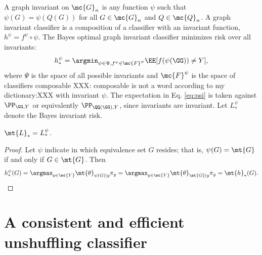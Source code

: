 \documentclass[10pt,journal,cspaper,compsoc]{IEEEtran}
\newcommand{\Qs}{Q}
\begin{document}
A graph invariant on $\mc{G}_n$ is any function $\psi$  such that $\psi(G)=\psi(\Qs(G))$ for all $G \in \mc{G}_n$ and $\Qs \in \mc{Q}_n$.  A graph invariant classifier is a composition of a classifier with an invariant function, $h^\psi=f^\psi \circ \psi$.  The Bayes optimal graph invariant classifier minimizes risk over all invariants: 
\begin{align} \label{eq:psi}
	h_*^{\psi}=\argmin_{\psi \in \Psi, f^{\psi} \in \mc{F}^{\psi}} \EE[f(\psi(\GG))\neq Y],
\end{align}
where $\Psi$ is the space of all possible invariants and $\mc{F}^{\psi}$ is the space of classifiers composable XXX: composable is not a word according to my dictionary:XXX with invariant $\psi$. The expectation in Eq. \eqref{eq:psi} is taken against $\PP_{\GG,Y}$ or equivalently $\PP_{\QQ(\GG),Y}$, since invariants are invariant.
  Let $L_*^{\psi}$ denote the Bayes invariant risk.  
\begin{thm}
	$\mt{L}_*=L_*^\psi$.
\end{thm}

\begin{proof}
Let $\psi$ indicate in which equivalence set $G$ resides; that is,  $\psi(G)=\mt{G}$ if and only if $G \in \mt{G}$.  Then
\begin{align}
	h^{\psi}_*(G)= \argmax_{y \in \mc{Y}} \mt{\theta}_{\psi(G)|y} \pi_y = \argmax_{y \in \mc{Y}} \mt{\theta}_{\mt{G}|y} \pi_y = \mt{h}_*(G).
\end{align}
\end{proof}



\section{A consistent and efficient unshuffling classifier} %
\label{sec:bayes_optimal_graph_invariant_based_classifier}
\end{document}
